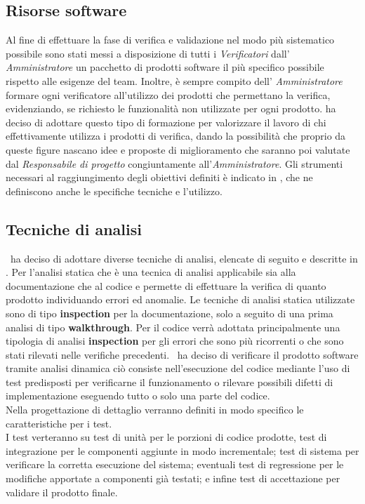 \subsection{Risorse software}
Al fine di effettuare la fase di verifica e validazione nel modo più sistematico possibile sono stati messi a disposizione di tutti i \textit{Verificatori} dall' \textit{Amministratore} un pacchetto di prodotti software il più specifico possibile rispetto alle esigenze del team. Inoltre, è sempre compito dell' \textit{Amministratore} formare ogni verificatore all'utilizzo dei prodotti che permettano la verifica, evidenziando, se richiesto le funzionalità non utilizzate per ogni prodotto. \gruppo{} ha deciso di adottare questo tipo di formazione per valorizzare il lavoro di chi effettivamente utilizza i prodotti di verifica, dando la possibilità che proprio da queste figure nascano idee e proposte di miglioramento che saranno poi valutate dal \textit{Responsabile di progetto} congiuntamente all'\textit{Amministratore}.
Gli strumenti necessari al raggiungimento degli obiettivi definiti è indicato in \infoNDP, che ne definiscono anche le specifiche tecniche e l'utilizzo.
\subsection{Tecniche di analisi}
\gruppo ~ha deciso di adottare diverse tecniche di analisi, elencate di seguito e descritte in \infoNDP.
Per l'analisi statica che è una tecnica di analisi applicabile sia alla documentazione che al codice e permette di effettuare la verifica di quanto prodotto individuando errori ed anomalie. Le tecniche di analisi statica utilizzate sono di tipo \textbf{inspection} per la documentazione, solo a seguito di una prima analisi di tipo \textbf{walkthrough}. Per il codice verrà adottata principalmente una tipologia di analisi \textbf{inspection} per gli errori che sono più ricorrenti o che sono stati rilevati nelle verifiche precedenti.
\gruppo ~ha deciso di verificare il prodotto software tramite analisi dinamica ciò consiste nell'esecuzione del codice mediante l'uso di test predisposti per verificarne il funzionamento o rilevare possibili difetti di implementazione eseguendo tutto o solo una parte del codice.\\
Nella progettazione di dettaglio verranno definiti in modo specifico le caratteristiche per i test.\\
I test verteranno su test di unità per le porzioni di codice prodotte, test di integrazione per le componenti aggiunte in modo incrementale; test di sistema per verificare la corretta esecuzione del sistema; eventuali test di regressione per le modifiche apportate a componenti già testati; e infine test di accettazione per validare il prodotto finale.